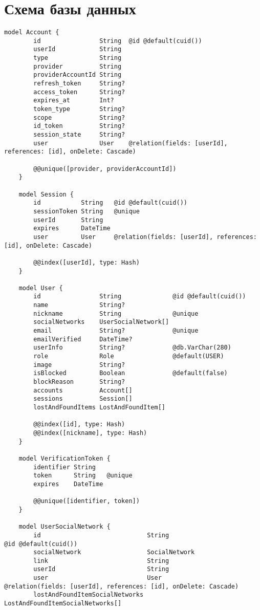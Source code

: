 \section{Схема базы данных}

\begin{lstlisting}[label=lst:factorial]
	model Account {
		id                String  @id @default(cuid())
		userId            String
		type              String
		provider          String
		providerAccountId String
		refresh_token     String?
		access_token      String?
		expires_at        Int?
		token_type        String?
		scope             String?
		id_token          String?
		session_state     String?
		user              User    @relation(fields: [userId], references: [id], onDelete: Cascade)
		
		@@unique([provider, providerAccountId])
	}
	
	model Session {
		id           String   @id @default(cuid())
		sessionToken String   @unique
		userId       String
		expires      DateTime
		user         User     @relation(fields: [userId], references: [id], onDelete: Cascade)
		
		@@index([userId], type: Hash)
	}
	
	model User {
		id                String              @id @default(cuid())
		name              String?
		nickname          String              @unique
		socialNetworks    UserSocialNetwork[]
		email             String?             @unique
		emailVerified     DateTime?
		userInfo          String?             @db.VarChar(280)
		role              Role                @default(USER)
		image             String?
		isBlocked         Boolean             @default(false)
		blockReason       String?
		accounts          Account[]
		sessions          Session[]
		lostAndFoundItems LostAndFoundItem[]
		
		@@index([id], type: Hash)
		@@index([nickname], type: Hash)
	}
	
	model VerificationToken {
		identifier String
		token      String   @unique
		expires    DateTime
		
		@@unique([identifier, token])
	}
	
	model UserSocialNetwork {
		id                             String                           @id @default(cuid())
		socialNetwork                  SocialNetwork
		link                           String
		userId                         String
		user                           User                             @relation(fields: [userId], references: [id], onDelete: Cascade)
		lostAndFoundItemSocialNetworks LostAndFoundItemSocialNetworks[]
		

\end{lstlisting}
